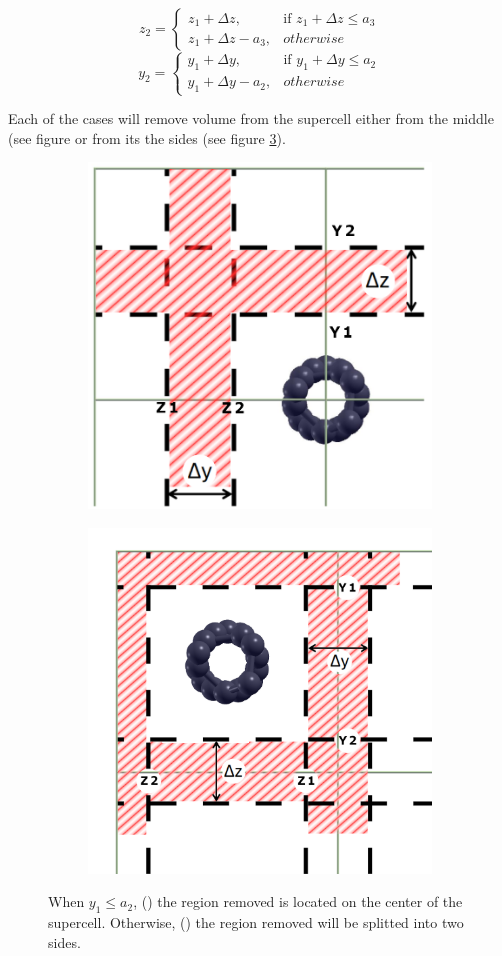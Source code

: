 \documentclass[a4paper,12pt]{report}
\begin{document}
\[
z_2=
\begin{cases}
z_1+\Delta z, & \text{if } z_1+\Delta z \leq a_3 \\
z_1+\Delta z-a_3, & otherwise
\end{cases}
\]
\[
y_2=
\begin{cases}
y_1+\Delta y, & \text{if } y_1+\Delta y \leq a_2 \\
y_1+\Delta y-a_2, & otherwise
\end{cases}
\]

 Each of the cases will remove volume from the supercell either from the middle (see figure 
 or from its the sides (see figure \ref{fig:vcut}).

\begin{figure}[h]
    \centering
    \begin{subfigure}{.5\textwidth}
        \centering
        \includegraphics[width=.5\linewidth]{figures/cnt_vcut_center.png}
        \label{fig:vcutcenter}
        \subcaption{}
    \end{subfigure}%
    \begin{subfigure}{.5\textwidth}
        \centering
        \includegraphics[width=.5\linewidth]{figures/cnt_vcut_sides.png}
        \label{fig:vcutsides}
        \subcaption{}
    \end{subfigure}
    \caption{When \(y_1 \leq a_2\), () the region removed is located
    on the center of the supercell.
    Otherwise, () the region removed will be splitted into two sides.}
    \label{fig:vcut}
\end{figure}
\end{document}
